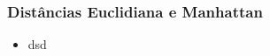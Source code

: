 \begin{frame}
	\frametitle{Distâncias Euclidiana e Manhattan}
	\begin{itemize}
		\item dsd
	\end{itemize}
\end{frame}

